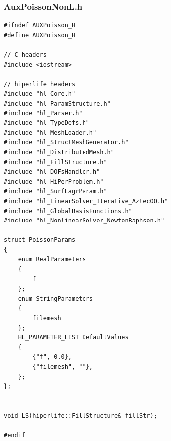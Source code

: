 \documentclass[]{article}
\begin{document}
\subsubsection{AuxPoissonNonL.h} \label{sec: a.h}
\begin{lstlisting}
#ifndef AUXPoisson_H
#define AUXPoisson_H

// C headers
#include <iostream>

// hiperlife headers
#include "hl_Core.h"
#include "hl_ParamStructure.h"
#include "hl_Parser.h"
#include "hl_TypeDefs.h"
#include "hl_MeshLoader.h"
#include "hl_StructMeshGenerator.h"
#include "hl_DistributedMesh.h"
#include "hl_FillStructure.h"
#include "hl_DOFsHandler.h"
#include "hl_HiPerProblem.h"
#include "hl_SurfLagrParam.h"
#include "hl_LinearSolver_Iterative_AztecOO.h"
#include "hl_GlobalBasisFunctions.h"
#include "hl_NonlinearSolver_NewtonRaphson.h"

struct PoissonParams
{
	enum RealParameters
	{
		f
	};
	enum StringParameters
	{
		filemesh
	};
	HL_PARAMETER_LIST DefaultValues
	{
		{"f", 0.0},
		{"filemesh", ""},
	};
};


void LS(hiperlife::FillStructure& fillStr);

#endif

\end{lstlisting}
\end{document}
